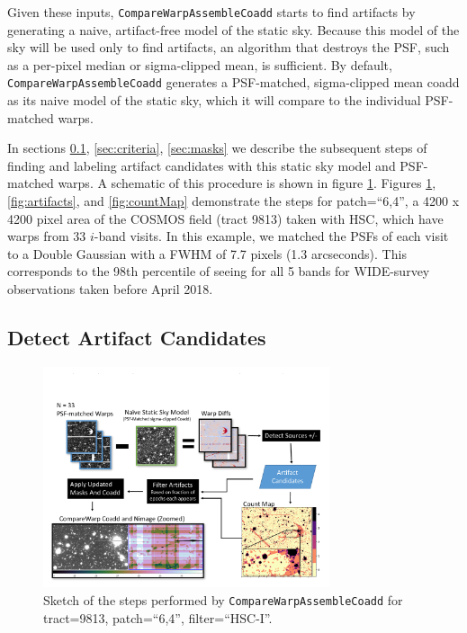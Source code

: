 \documentclass[DM,authoryear,toc]{lsstdoc}
\begin{document}
Given these inputs, \texttt{CompareWarpAssembleCoadd} starts to find artifacts by generating a naive, artifact-free model of the static sky.
Because this model of the sky will be used only to find artifacts, an algorithm that destroys the PSF, such as a per-pixel median or sigma-clipped mean, is sufficient.
By default, \texttt{CompareWarpAssembleCoadd} generates a PSF-matched, sigma-clipped mean coadd as its naive model of the static sky, which it will compare to the individual PSF-matched warps.

In sections \ref{sec:detect}, \ref{sec:criteria}, \ref{sec:masks} we describe the subsequent steps of finding and labeling artifact candidates with this static sky model and PSF-matched warps.
A schematic of this procedure is shown in figure \ref{fig:demo}.
Figures \ref{fig:demo}, \ref{fig:artifacts}, and \ref{fig:countMap} demonstrate the steps for patch=``6,4'', a 4200 x 4200 pixel area of the COSMOS field (tract 9813) taken with HSC, which have warps from 33 $i$-band visits.
In this example, we matched the PSFs of each visit to a Double Gaussian with a FWHM of 7.7 pixels (1.3 arcseconds).
This corresponds to the 98th percentile of seeing for all 5 bands for WIDE-survey observations taken before April 2018.

\subsection{Detect Artifact Candidates}
\label{sec:detect}

\begin{figure}
\begin{centering}
\includegraphics[width=0.75\textwidth]{figures/CompareWarpDemo.pdf}
\par\end{centering}
\caption{\label{fig:demo} Sketch of the steps performed by \texttt{CompareWarpAssembleCoadd} for tract=9813, patch=``6,4'', filter=``HSC-I''.}
\end{figure}
\end{document}
